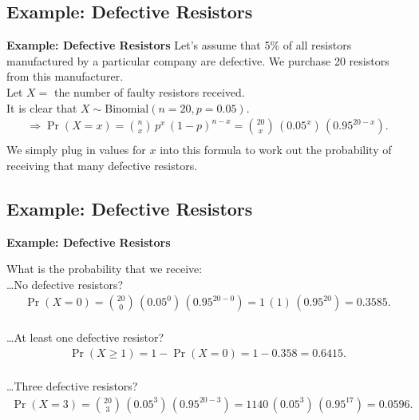 \documentclass[compress]{beamer}        %
\makeatletter
\newcommand{\tcb}{\textcolor{beamer@blendedblue}}
\makeatother
\begin{document}
\subsection{Example: Defective Resistors}
\begin{frame}{\bf \tcb{Example: Defective Resistors}}
Let's assume that 5\% of all resistors manufactured by a particular company are defective. We purchase 20 resistors from this manufacturer.\\[0.2cm]

Let $X= $ the number of faulty resistors received.\\[0.4cm]

It is clear that $X \sim \text{Binomial}(n=20, p=0.05)$.\\[-0.2cm]
\begin{align*}
\Rightarrow \Pr(X=x) = \binom{n}{x}\,p^x\,(1-p)^{n-x} = \binom{20}{x}\,(0.05^x)\,(0.95^{20-x}).\\
\end{align*}
We simply plug in values for $x$ into this formula to work out the probability of receiving that many defective resistors.

\end{frame}



\subsection{Example: Defective Resistors}
\begin{frame}{\bf \tcb{Example: Defective Resistors}}\label{binexample}

What is the probability that we receive:\\[0.5cm]

\ldots No defective resistors?
\begin{align*}
\Pr(X=0) = \binom{20}{0}\,(0.05^0)\,(0.95^{20-0}) = 1\,(1)\,(0.95^{20}) = 0.3585.\\
\end{align*}

\ldots At least one defective resistor?
\begin{align*}
\Pr(X\ge1) = 1 - \Pr(X=0) = 1 - 0.358 = 0.6415.\\
\end{align*}

\ldots Three defective resistors?
\begin{align*}
\Pr(X=3) = \binom{20}{3}\,(0.05^{3})\,(0.95^{20-3}) = 1140\,(0.05^{3})\,(0.95^{17}) = 0.0596.\\
\end{align*}

\end{frame}
\end{document}
